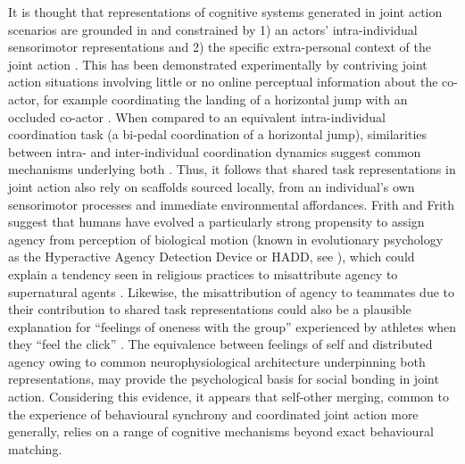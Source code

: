 
It is thought that representations of cognitive systems generated in joint action scenarios are grounded in and constrained by 1) an actors' intra-individual sensorimotor representations and 2) the specific extra-personal context of the joint action \citep{Sebanz2006}.  This has been demonstrated experimentally by contriving joint action situations involving little or no online perceptual information about the co-actor, for example coordinating the landing of a horizontal jump with an occluded co-actor \citep{Vesper2012}. When compared to an equivalent intra-individual coordination task (a bi-pedal coordination of a horizontal jump), similarities between intra- and inter-individual coordination dynamics suggest common mechanisms underlying both \citep{Schmidt2008}.  Thus, it follows that shared task representations in joint action also rely on scaffolds sourced locally, from an individual's own sensorimotor processes and immediate environmental affordances\citep{Williams2009}.
Frith and Frith \textcite{Frith2010} suggest that humans have evolved a particularly strong propensity to assign agency from perception of biological motion (known in evolutionary psychology as the Hyperactive Agency Detection Device or HADD, see \cite{Barrett2000,Barrett2007}), which could explain a tendency seen in religious practices to misattribute agency to supernatural agents \citep{Atran2010}.  Likewise, the misattribution of agency to teammates due to their contribution to shared task representations could also be a plausible explanation for ``feelings of oneness with the group'' experienced by athletes when they ``feel the click'' \citep{Swann2009}. The equivalence between feelings of self and distributed agency owing to common neurophysiological architecture underpinning both representations, may provide the psychological basis for social bonding in joint action.  Considering this evidence, it appears that self-other merging, common to the experience of behavioural synchrony and coordinated joint action more generally, relies on a range of cognitive mechanisms beyond exact behavioural matching.

